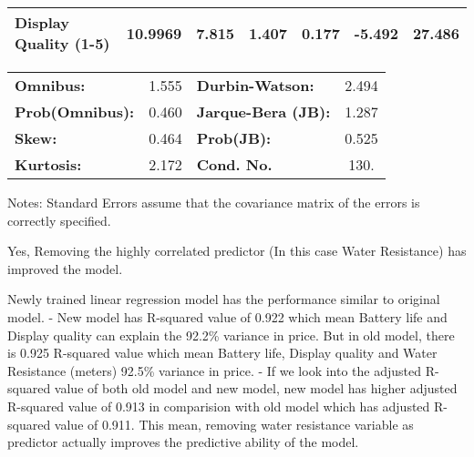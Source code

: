 \documentclass[11pt]{article}
\begin{document}
\begin{center}
\begin{tabular}{lcccccc}
\textbf{Display Quality (1-5)} &      10.9969  &        7.815     &     1.407  &         0.177        &       -5.492    &       27.486     \\
\bottomrule
\end{tabular}
\begin{tabular}{lclc}
\textbf{Omnibus:}       &  1.555 & \textbf{  Durbin-Watson:     } &    2.494  \\
\textbf{Prob(Omnibus):} &  0.460 & \textbf{  Jarque-Bera (JB):  } &    1.287  \\
\textbf{Skew:}          &  0.464 & \textbf{  Prob(JB):          } &    0.525  \\
\textbf{Kurtosis:}      &  2.172 & \textbf{  Cond. No.          } &     130.  \\
\bottomrule
\end{tabular}
\end{center}

Notes: \newline
 [1] Standard Errors assume that the covariance matrix of the errors is correctly specified.

    

    Yes, Removing the highly correlated predictor (In this case Water
Resistance) has improved the model.

Newly trained linear regression model has the performance similar to
original model. - New model has R-squared value of 0.922 which mean
Battery life and Display quality can explain the 92.2\% variance in
price. But in old model, there is 0.925 R-squared value which mean
Battery life, Display quality and Water Resistance (meters) 92.5\%
variance in price. - If we look into the adjusted R-squared value of
both old model and new model, new model has higher adjusted R-squared
value of 0.913 in comparision with old model which has adjusted
R-squared value of 0.911. This mean, removing water resistance variable
as predictor actually improves the predictive ability of the model.


    
    
    
\end{document}
